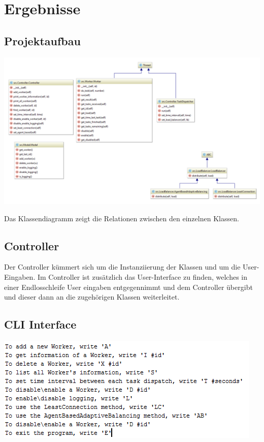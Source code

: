 
\section{Ergebnisse}
\label{sec:Ergebnisse}



\subsection{Projektaufbau}

\begin{minipage}{\linewidth}
	\centering
	\includegraphics[width=1\linewidth]{images/class_diagram}
\end{minipage}

Das Klassendiagramm zeigt die Relationen zwischen den einzelnen Klassen. 

\subsection{Controller}
Der Controller kümmert sich um die Instanziierung der Klassen und um die User-Eingaben.
Im Controller ist zusätzlich das User-Interface zu finden, welches in einer Endlosschleife User eingaben entgegennimmt und dem Controller übergibt und dieser dann an die zugehörigen Klassen weiterleitet.

\subsection{CLI Interface}
 \begin{minipage}{\linewidth}
 	\centering
 	\includegraphics[width=0.8\linewidth]{images/cli_interface}
 \end{minipage}
 

